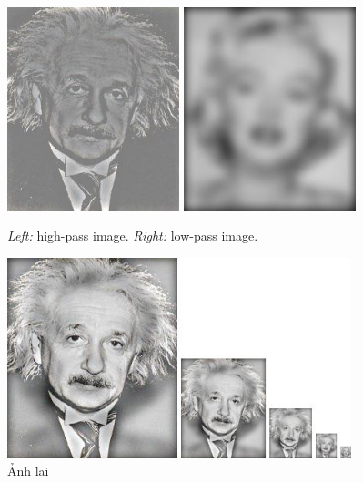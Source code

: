 \begin{figure}[H]
    \centering
    \includegraphics[width=5cm]{images/results_part2/marilyn_einstein/high_frequencies.jpg}
    \includegraphics[width=5cm]{images/results_part2/marilyn_einstein/low_frequencies.jpg}
    \caption{\emph{Left:} high-pass image. \emph{Right:} low-pass image.}
\end{figure}
\begin{figure}[H]
    \centering
    \includegraphics[width=10cm]{images/results_part2/marilyn_einstein/hybrid_image_scales.jpg}
    \caption{Ảnh lai}
\end{figure}

